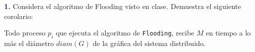 \newpage
\textbf{\textcolor{MidnightBlue}{1.}}
Considera el algoritmo de Flooding visto en clase.
Demuestra el siguiente corolario:                                                        

Todo proceso $p_i$ que ejecuta el algoritmo de
{\tt Flooding}, recibe $M$ en tiempo a lo más el
diámetro $diam(G)$ de la gráfica del sistema
distribuido.
